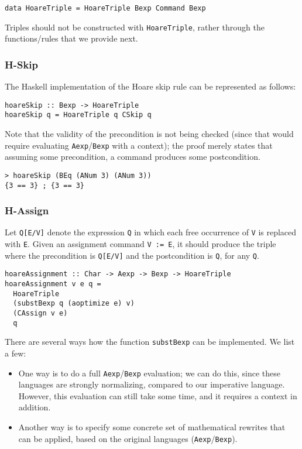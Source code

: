\documentclass{article}
\begin{document}
\begin{lstlisting}
data HoareTriple = HoareTriple Bexp Command Bexp
\end{lstlisting}

Triples should not be constructed with \texttt{HoareTriple}, rather through the functions/rules that we provide next.

\subsubsection{H-Skip}

The Haskell implementation of the Hoare skip rule can be represented as follows:

\begin{lstlisting}
hoareSkip :: Bexp -> HoareTriple
hoareSkip q = HoareTriple q CSkip q
\end{lstlisting}

Note that the validity of the precondition is not being checked (since that would require evaluating \texttt{Aexp}/\texttt{Bexp} with a context); the proof merely states that assuming some precondition, a command produces some postcondition.

\begin{lstlisting}
> hoareSkip (BEq (ANum 3) (ANum 3))
{3 == 3} ; {3 == 3}
\end{lstlisting}

\subsubsection{H-Assign}

Let \texttt{Q[E/V]} denote the expression \texttt{Q} in which each free occurrence of \texttt{V} is replaced with \texttt{E}. Given an assignment command \texttt{V := E}, it should produce the triple where the precondition is \texttt{Q[E/V]} and the postcondition is \texttt{Q}, for any \texttt{Q}.

\begin{lstlisting}
hoareAssignment :: Char -> Aexp -> Bexp -> HoareTriple
hoareAssignment v e q =
  HoareTriple
  (substBexp q (aoptimize e) v)
  (CAssign v e)
  q
\end{lstlisting}

There are several ways how the function \texttt{substBexp} can be implemented. We list a few:

\begin{itemize}
\item One way is to do a full \texttt{Aexp}/\texttt{Bexp} evaluation; we can do this, since these languages are strongly normalizing, compared to our imperative language. However, this evaluation can still take some time, and it requires a context in addition.
\item Another way is to specify some concrete set of mathematical rewrites that can be applied, based on the original languages (\texttt{Aexp}/\texttt{Bexp}).
\end{itemize}
\end{document}
